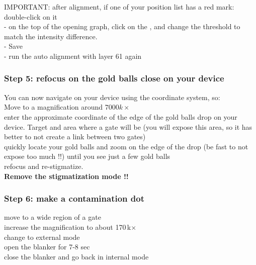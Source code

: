 IMPORTANT: after alignment, if one of your position list has a red mark:\\
double-click on it\\
- on the top of the opening graph, click on the , and change the threshold to match the intensity difference.\\
- Save\\
- run the auto alignment with layer 61 again\\


\subsubsection{Step 5: refocus on the gold balls close on your device}
You can now navigate on your device using the coordinate system, so:\\

Move to a magnification around $7000 k \times$\\

enter the approximate coordinate of the edge of the gold balls drop on your device. Target and area where a gate will be (you will expose this area, so it has better to not create a link between two gates)\\

quickly locate your gold balls and zoom on the edge of the drop (be fast to not expose too much !!) until you see just a few gold balls\\

refocus and re-stigmatize.\\

\textbf{Remove the stigmatization mode !!}\\


\subsubsection{Step 6: make a contamination dot}

move to a wide region of a gate\\

increase the magnification to about 170\,k$\times$\\

change to external mode\\

open the blanker for 7-8 sec\\

close the blanker and go back in internal mode\\

